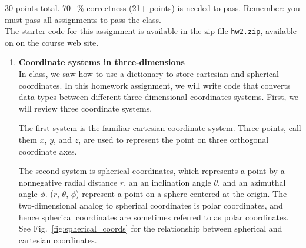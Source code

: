 \documentclass{article}
\newcounter{points}
\newcommand\setpoints[1]{\addtocounter{points}{#1}(#1 points)}
\begin{document}
\pagestyle{fancy}

30 points total.  70+\% correctness (21+ points) is needed to pass.  Remember: you must pass all assignments to pass the class. \\

The starter code for this assignment is available in the zip file \texttt{hw2.zip}, available on on the course web site.

\begin{enumerate}



\item \textbf{Coordinate systems in three-dimensions} \\
In class, we saw how to use a dictionary to store cartesian and spherical coordinates.  In this homework assignment, we will write code that converts data types between different three-dimensional coordinates systems.  First, we will review three coordinate systems.

The first system is the familiar cartesian coordinate system.  Three points, call them $x$, $y$, and $z$, are used to represent the point on three orthogonal coordinate axes.

The second system is spherical coordinates, which represents a point by a nonnegative radial distance $r$, an an inclination angle $\theta$, and an azimuthal angle $\phi$.  ($r$, $\theta$, $\phi$) represent a point on a sphere centered at the origin.  The two-dimensional analog to spherical coordinates is polar coordinates, and hence spherical coordinates are sometimes referred to as polar coordinates.  See Fig.~\ref{fig:spherical_coords} for the relationship between spherical and cartesian coordinates.


\end{enumerate}
\end{document}
